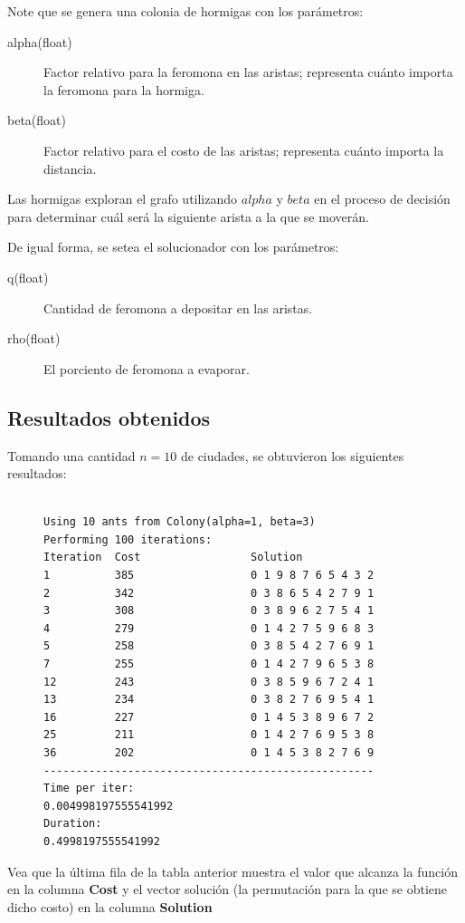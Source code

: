 \documentclass[titlepage, 11pt]{scrartcl}
\begin{document}
 				Note que se genera una colonia de hormigas con los parámetros:
 				\begin{description}
 					\item[alpha(float)] Factor relativo para la feromona en las aristas; representa cuánto importa la feromona para la hormiga.
 					\item[beta(float)] Factor relativo para el costo de las aristas; representa cuánto importa la distancia.
 				\end{description}
 				Las hormigas exploran el grafo utilizando $alpha$ y $beta$ en el proceso de decisión para determinar cuál será la siguiente arista a la que se moverán.
 				
 				De igual forma, se setea el solucionador con los parámetros:
 				\begin{description}
 					\item[q(float)] Cantidad de feromona a depositar en las aristas.
 					\item[rho(float)] El porciento de feromona a evaporar.
 				\end{description}
 		
 		\subsection{Resultados obtenidos}
 		Tomando una cantidad $n = 10$ de ciudades, se obtuvieron los siguientes resultados:
		\begin{figure}[H]
			\begin{verbatim}

Using 10 ants from Colony(alpha=1, beta=3)
Performing 100 iterations:
Iteration  Cost                 Solution
1          385                  0 1 9 8 7 6 5 4 3 2
2          342                  0 3 8 6 5 4 2 7 9 1
3          308                  0 3 8 9 6 2 7 5 4 1
4          279                  0 1 4 2 7 5 9 6 8 3
5          258                  0 3 8 5 4 2 7 6 9 1
7          255                  0 1 4 2 7 9 6 5 3 8
12         243                  0 3 8 5 9 6 7 2 4 1
13         234                  0 3 8 2 7 6 9 5 4 1
16         227                  0 1 4 5 3 8 9 6 7 2
25         211                  0 1 4 2 7 6 9 5 3 8
36         202                  0 1 4 5 3 8 2 7 6 9
---------------------------------------------------
Time per iter:
0.004998197555541992
Duration:
0.4998197555541992

			\end{verbatim}
		\end{figure}
		Vea que la última fila de la tabla anterior muestra el valor que alcanza la función en la columna \textbf{Cost} y el vector solución (la permutación para la que se obtiene dicho costo) en la columna \textbf{Solution}
 		
\end{document}
